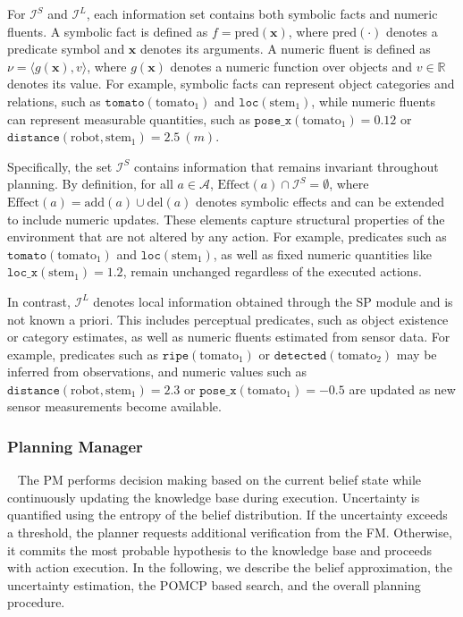 For $\mathcal{I}^{S}$ and $\mathcal{I}^{L}$, each information set contains both symbolic facts and numeric fluents. A symbolic fact is defined as $f = \text{pred}(\mathbf{x})$, where $\text{pred}(\cdot)$ denotes a predicate symbol and $\mathbf{x}$ denotes its arguments. A numeric fluent is defined as $\nu = \langle g(\mathbf{x}), v \rangle$, where $g(\mathbf{x})$ denotes a numeric function over objects and $v \in \mathbb{R}$ denotes its value. For example, symbolic facts can represent object categories and relations, such as $\texttt{tomato}(\text{tomato}_1)$ and $\texttt{loc}(\text{stem}_1)$, while numeric fluents can represent measurable quantities, such as $\texttt{pose\_x}(\text{tomato}_1)=0.12$ or $\texttt{distance}(\text{robot}, \text{stem}_1)=2.5\ (m)$.


Specifically, the set $\mathcal{I}^{S}$ contains information that remains invariant throughout planning. By definition, for all $a \in \mathcal{A}$, $\mathrm{Effect}(a) \cap \mathcal{I}^{S} = \emptyset$, where $\mathrm{Effect}(a)=\mathrm{add}(a) \cup \mathrm{del}(a)$ denotes symbolic effects and can be extended to include numeric updates. These elements capture structural properties of the environment that are not altered by any action. For example, predicates such as $\texttt{tomato}(\text{tomato}_1)$ and $\texttt{loc}(\text{stem}_1)$, as well as fixed numeric quantities like $\texttt{loc\_x}(\text{stem}_1)=1.2$, remain unchanged regardless of the executed actions.


In contrast, $\mathcal{I}^{L}$ denotes local information obtained through the SP module and is not known a priori. This includes perceptual predicates, such as object existence or category estimates, as well as numeric fluents estimated from sensor data. For example, predicates such as $\texttt{ripe}(\text{tomato}_1)$ or $\texttt{detected}(\text{tomato}_2)$ may be inferred from observations, and numeric values such as $\texttt{distance}(\text{robot}, \text{stem}_1)=2.3$ or $\texttt{pose\_x}(\text{tomato}_1)=-0.5$ are updated as new sensor measurements become available.



\subsubsection{Planning Manager}~\label{method:PM}
The PM performs decision making based on the current belief state while continuously updating the knowledge base during execution. Uncertainty is quantified using the entropy of the belief distribution. If the uncertainty exceeds a threshold, the planner requests additional verification from the FM. Otherwise, it commits the most probable hypothesis to the knowledge base and proceeds with action execution. In the following, we describe the belief approximation, the uncertainty estimation, the POMCP based search, and the overall planning procedure.



